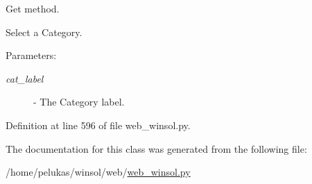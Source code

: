 Get method. 

Select a Category.

\begin{Desc}
\item[Parameters:]
\begin{description}
\item[{\em cat\_\-label}]- The Category label. \end{description}
\end{Desc}


Definition at line 596 of file web\_\-winsol.py.

The documentation for this class was generated from the following file:\begin{CompactItemize}
\item 
/home/pelukas/winsol/web/\hyperlink{web__winsol_8py}{web\_\-winsol.py}\end{CompactItemize}
